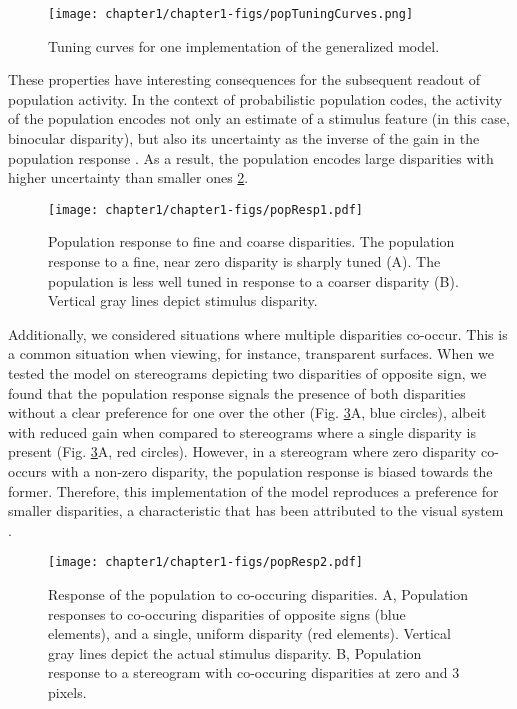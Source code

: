 \begin{figure}
  \centering
  \texttt{[image: chapter1/chapter1-figs/popTuningCurves.png]}
  \caption[Tuning curves under the generalized model.]{Tuning curves for one implementation of the generalized model.}
  \label{fig:PopTuningCurves}
\end{figure}

These properties have interesting consequences for the subsequent readout of population activity. In the context of probabilistic population codes, the activity of the population encodes not only an estimate of a stimulus feature (in this case, binocular disparity), but also its uncertainty as the inverse of the gain in the population response \cite{Ma:2006fk}. As a result, the population encodes large disparities with higher uncertainty than smaller ones \ref{fig:PopResp1}. 

\begin{figure}
  \centering
  \texttt{[image: chapter1/chapter1-figs/popResp1.pdf]}
  \caption[Population response to fine and coarse disparities.]{Population response to fine and coarse disparities. The population response to a fine, near zero disparity is sharply tuned (A). The population is less well tuned in response to a coarser disparity (B). Vertical gray lines depict stimulus disparity.}
  \label{fig:PopResp1}
\end{figure}

Additionally, we considered situations where multiple disparities co-occur. This is a common situation when viewing, for instance, transparent surfaces. When we tested the model on stereograms depicting two disparities of opposite sign, we found that the population response signals the presence of both disparities without a clear preference for one over the other (Fig. \ref{fig:PopResp2}A, blue circles), albeit with reduced gain when compared to stereograms where a single disparity is present (Fig. \ref{fig:PopResp2}A, red circles). However, in a stereogram where zero disparity co-occurs with a non-zero disparity, the population response is biased towards the former. Therefore, this implementation of the model reproduces a preference for smaller disparities, a characteristic that has been attributed to the visual system \cite{Read:2002uq}.  

\begin{figure}
  \centering
  \texttt{[image: chapter1/chapter1-figs/popResp2.pdf]}
  \caption[Population response to concurrent disparities.]{Response of the population to co-occuring disparities. A, Population responses to co-occuring disparities of opposite signs (blue elements), and a single, uniform disparity (red elements). Vertical gray lines depict the actual stimulus disparity. B, Population response to a stereogram with co-occuring disparities at zero and 3 pixels.}
  \label{fig:PopResp2}
\end{figure}

